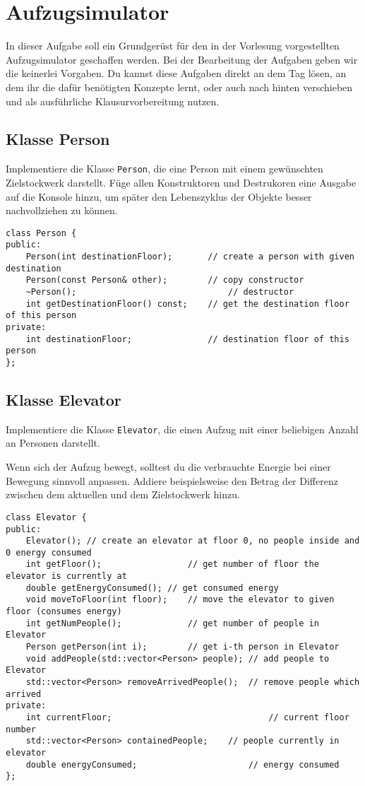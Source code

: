 \section{Aufzugsimulator}
In dieser Aufgabe soll ein Grundgerüst für den in der Vorlesung vorgestellten Aufzugsimulator geschaffen werden.
Bei der Bearbeitung der Aufgaben geben wir die keinerlei Vorgaben.
Du kannst diese Aufgaben direkt an dem Tag lösen, an dem ihr die dafür benötigten Konzepte lernt, oder auch nach hinten verschieben und als ausführliche Klausurvorbereitung nutzen.

\subsection{Klasse Person}
Implementiere die Klasse \lstinline{Person}, die eine Person mit einem gewünschten Zielstockwerk darstellt.
Füge allen Konstruktoren und Destrukoren eine Ausgabe auf die Konsole hinzu, um später den Lebenszyklus der Objekte besser nachvollziehen zu können.

\begin{lstlisting}
class Person {
public:
	Person(int destinationFloor);		// create a person with given destination
	Person(const Person& other);		// copy constructor
	~Person();								// destructor
	int getDestinationFloor() const;	// get the destination floor of this person
private:
	int destinationFloor;				// destination floor of this person
};
\end{lstlisting}

\subsection{Klasse Elevator}
Implementiere die Klasse \lstinline{Elevator}, die einen Aufzug mit einer beliebigen Anzahl an Personen darstellt.

Wenn sich der Aufzug bewegt, solltest du die verbrauchte Energie bei einer Bewegung sinnvoll anpassen.
Addiere beispielsweise den Betrag der Differenz zwischen dem aktuellen und dem Zielstockwerk hinzu.

\begin{lstlisting}
class Elevator {
public:
	Elevator();	// create an elevator at floor 0, no people inside and 0 energy consumed
	int getFloor();					// get number of floor the elevator is currently at
	double getEnergyConsumed();	// get consumed energy
	void moveToFloor(int floor);	// move the elevator to given floor (consumes energy)
	int getNumPeople();				// get number of people in Elevator
	Person getPerson(int i);		// get i-th person in Elevator
	void addPeople(std::vector<Person> people);	// add people to Elevator
	std::vector<Person> removeArrivedPeople();	// remove people which arrived
private:
	int currentFloor;								// current floor number
	std::vector<Person> containedPeople;	// people currently in elevator
	double energyConsumed;						// energy consumed
};
\end{lstlisting}

